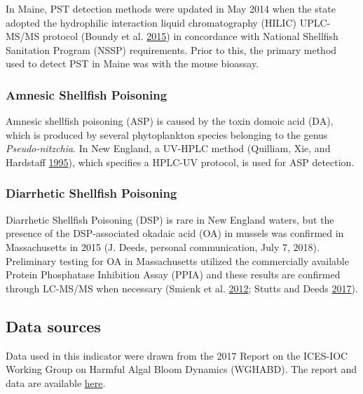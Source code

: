 \documentclass[
]{book}
\begin{document}
In Maine, PST detection methods were updated in May 2014 when the state adopted the hydrophilic interaction liquid chromatography (HILIC) UPLC-MS/MS protocol (Boundy et al. \protect\hyperlink{ref-Boundy2015}{2015}) in concordance with National Shellfish Sanitation Program (NSSP) requirements. Prior to this, the primary method used to detect PST in Maine was with the mouse bioassay.

\hypertarget{amnesic-shellfish-poisoning}{%
\subsubsection{Amnesic Shellfish Poisoning}\label{amnesic-shellfish-poisoning}}

Amnesic shellfish poisoning (ASP) is caused by the toxin domoic acid (DA), which is produced by several phytoplankton species belonging to the genus \emph{Pseudo-nitzchia}. In New England, a UV-HPLC method (Quilliam, Xie, and Hardstaff \protect\hyperlink{ref-Quilliam1995}{1995}), which specifies a HPLC-UV protocol, is used for ASP detection.

\hypertarget{diarrhetic-shellfish-poisoning}{%
\subsubsection{Diarrhetic Shellfish Poisoning}\label{diarrhetic-shellfish-poisoning}}

Diarrhetic Shellfish Poisoning (DSP) is rare in New England waters, but the presence of the DSP-associated okadaic acid (OA) in mussels was confirmed in Massachusetts in 2015 (J. Deeds, personal communication, July 7, 2018). Preliminary testing for OA in Massachusetts utilized the commercially available Protein Phosphatase Inhibition Assay (PPIA) and these results are confirmed through LC-MS/MS when necessary (Smienk et al. \protect\hyperlink{ref-Smienk2012}{2012}; Stutts and Deeds \protect\hyperlink{ref-Stutts2017}{2017}).

\hypertarget{data-sources-23}{%
\subsection{Data sources}\label{data-sources-23}}

Data used in this indicator were drawn from the 2017 Report on the ICES-IOC Working Group on Harmful Algal Bloom Dynamics (WGHABD). The report and data are available \href{http://www.ices.dk/sites/pub/Publication\%20Reports/Expert\%20Group\%20Report/SSGEPD/2017/01\%20WGHABD\%20-\%20Report\%20of\%20the\%20ICES\%20-\%20IOC\%20Working\%20Group\%20on\%20Harmful\%20Algal\%20Bloom\%20Dynamics.pdf}{here}.
\end{document}

